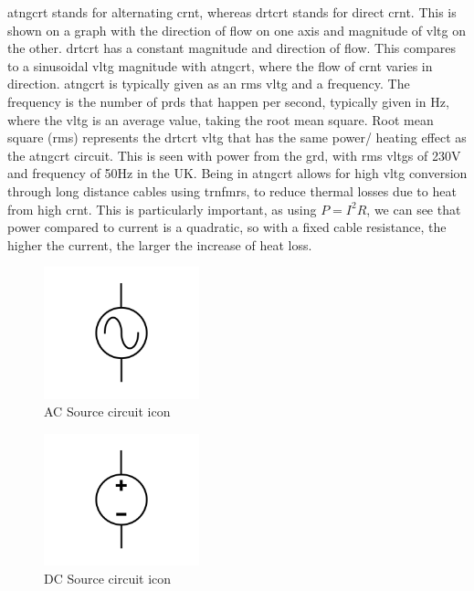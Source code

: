 \documentclass[a4paper,11pt]{report}
\begin{document}
\gls{atngcrt} stands for alternating \gls{crnt}, whereas \gls{drtcrt} stands for direct \gls{crnt}. This is shown on a graph with the direction of flow on one axis and magnitude of \gls{vltg} on the other. \gls{drtcrt} has a constant magnitude and direction of flow. This compares to a sinusoidal \gls{vltg} magnitude with \gls{atngcrt}, where the flow of \gls{crnt} varies in direction. \gls{atngcrt} is typically given as an \gls{rms} \gls{vltg} and a frequency. The frequency is the number of \gls{prd}s that happen per second, typically given in Hz, where the \gls{vltg} is an average value, taking the root mean square. Root mean square (\gls{rms}) represents the \gls{drtcrt} \gls{vltg} that has the same power/ heating effect as the \gls{atngcrt} circuit. This is seen with power from the \gls{grd}, with \gls{rms} \gls{vltg}s of 230V and frequency of 50Hz in the UK.
Being in \gls{atngcrt} allows for high \gls{vltg} conversion through long distance cables using \gls{trnfmr}s, to reduce thermal losses due to heat from high \gls{crnt}.
This is particularly important, as using $P=I^2R$, we can see that power compared to current is a quadratic, so with a fixed cable resistance, the higher the current, the larger the increase of heat loss.

\begin{figure}[H]
\centering
\includegraphics[width=0.4\textwidth]{acsource1}
\caption{AC Source circuit icon}
\end{figure}

\begin{figure}[H]
\centering
\includegraphics[width=0.4\textwidth]{dcsource1}
\caption{DC Source circuit icon}
\end{figure}
\end{document}
